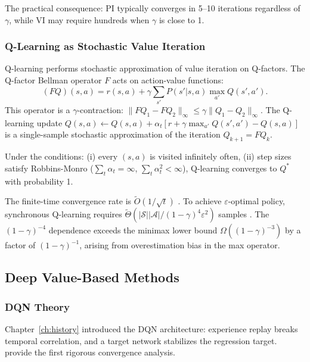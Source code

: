 The practical consequence: PI typically converges in 5--10 iterations regardless of $\gamma$, while VI may require hundreds when $\gamma$ is close to 1.


\subsubsection{Q-Learning as Stochastic Value Iteration}

Q-learning \citep{WatkinsDayan1992} performs stochastic approximation of value iteration on Q-factors. The Q-factor Bellman operator $F$ acts on action-value functions:
\begin{equation}
(FQ)(s,a) = r(s,a) + \gamma \sum_{s'} P(s'|s,a) \max_{a'} Q(s',a').
\end{equation}
This operator is a $\gamma$-contraction: $\|FQ_1 - FQ_2\|_\infty \leq \gamma \|Q_1 - Q_2\|_\infty$. The Q-learning update $Q(s,a) \leftarrow Q(s,a) + \alpha_t [r + \gamma \max_{a'} Q(s',a') - Q(s,a)]$ is a single-sample stochastic approximation of the iteration $Q_{k+1} = FQ_k$.

\begin{theorem}
\label{thm:q_convergence}
Under the conditions: (i) every $(s,a)$ is visited infinitely often, (ii) step sizes satisfy Robbins-Monro ($\sum_t \alpha_t = \infty$, $\sum_t \alpha_t^2 < \infty$), Q-learning converges to $Q^*$ with probability 1.
\end{theorem}

The finite-time convergence rate is $\tilde{O}(1/\sqrt{t})$ \citep{evendar2003}. To achieve $\varepsilon$-optimal policy, synchronous Q-learning requires $\tilde{\Theta}(|\mathcal{S}||\mathcal{A}|/(1-\gamma)^4\varepsilon^2)$ samples \citep{li2024minimax}. The $(1-\gamma)^{-4}$ dependence exceeds the minimax lower bound $\Omega((1-\gamma)^{-3})$ by a factor of $(1-\gamma)^{-1}$, arising from overestimation bias in the max operator.


\subsection{Deep Value-Based Methods}
\label{sec:deep_value}

\subsubsection{DQN Theory}

Chapter~\ref{ch:history} introduced the DQN architecture: experience replay breaks temporal correlation, and a target network stabilizes the regression target. \citet{fan2020dqn} provide the first rigorous convergence analysis.

